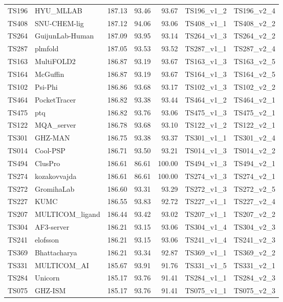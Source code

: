\begin{table}[ht]
{\begin{tabular}{llrrrll}
TS196 & HYU\_MLLAB & 187.13 & 93.46 & 93.67 & TS196\_v1\_2 & TS196\_v2\_4 \\ 
TS408 & SNU-CHEM-lig & 187.12 & 94.06 & 93.06 & TS408\_v1\_1 & TS408\_v2\_2 \\ 
TS264 & GuijunLab-Human & 187.09 & 93.95 & 93.14 & TS264\_v1\_3 & TS264\_v2\_2 \\ 
TS287 & plmfold & 187.05 & 93.53 & 93.52 & TS287\_v1\_1 & TS287\_v2\_4 \\ 
TS163 & MultiFOLD2 & 186.87 & 93.19 & 93.67 & TS163\_v1\_3 & TS163\_v2\_5 \\ 
TS164 & McGuffin & 186.87 & 93.19 & 93.67 & TS164\_v1\_3 & TS164\_v2\_5 \\ 
TS102 & Psi-Phi & 186.86 & 93.68 & 93.17 & TS102\_v1\_3 & TS102\_v2\_2 \\ 
TS464 & PocketTracer & 186.82 & 93.38 & 93.44 & TS464\_v1\_2 & TS464\_v2\_1 \\ 
TS475 & ptq & 186.82 & 93.76 & 93.06 & TS475\_v1\_3 & TS475\_v2\_1 \\ 
TS122 & MQA\_server & 186.78 & 93.68 & 93.10 & TS122\_v1\_2 & TS122\_v2\_1 \\ 
TS301 & GHZ-MAN & 186.75 & 93.38 & 93.37 & TS301\_v1\_1 & TS301\_v2\_4 \\ 
TS014 & Cool-PSP & 186.71 & 93.50 & 93.21 & TS014\_v1\_3 & TS014\_v2\_2 \\ 
TS494 & ClusPro & 186.61 & 86.61 & 100.00 & TS494\_v1\_3 & TS494\_v2\_1 \\ 
TS274 & kozakovvajda & 186.61 & 86.61 & 100.00 & TS274\_v1\_3 & TS274\_v2\_1 \\ 
TS272 & GromihaLab & 186.60 & 93.31 & 93.29 & TS272\_v1\_3 & TS272\_v2\_5 \\ 
TS227 & KUMC & 186.55 & 93.83 & 92.72 & TS227\_v1\_1 & TS227\_v2\_4 \\ 
TS207 & MULTICOM\_ligand & 186.44 & 93.42 & 93.02 & TS207\_v1\_1 & TS207\_v2\_2 \\ 
TS304 & AF3-server & 186.21 & 93.15 & 93.06 & TS304\_v1\_4 & TS304\_v2\_3 \\ 
TS241 & elofsson & 186.21 & 93.15 & 93.06 & TS241\_v1\_4 & TS241\_v2\_3 \\ 
TS369 & Bhattacharya & 186.21 & 93.34 & 92.87 & TS369\_v1\_1 & TS369\_v2\_2 \\ 
TS331 & MULTICOM\_AI & 185.67 & 93.91 & 91.76 & TS331\_v1\_5 & TS331\_v2\_1 \\ 
TS284 & Unicorn & 185.17 & 93.76 & 91.41 & TS284\_v1\_1 & TS284\_v2\_3 \\ 
TS075 & GHZ-ISM & 185.17 & 93.76 & 91.41 & TS075\_v1\_1 & TS075\_v2\_3 \\ 

\end{tabular}}
\end{table}
